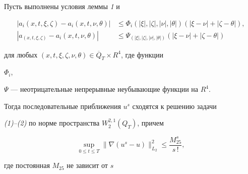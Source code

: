 \begin{thm}


Пусть выполнены условия леммы {\em 1} и


\begin{equation}


\begin{split}


|a_i(x,t,\xi,\zeta)-a_i(x,t,\nu,\theta)|&\le


\Phi_i(|\xi|,|\zeta|,|\nu|,|\theta|)(|\xi-\nu|+|\zeta-\theta|),\\


|a_(x,t,\xi,\zeta)-a_i(x,t,\nu,\theta)|&\le


\Psi_(|\xi|,|\zeta|,|\nu|,|\theta|)(|\xi-\nu|+|\zeta-\theta|)


\end{split}


\end{equation}


для любых $(x,t,\xi,\zeta,\nu,\theta)\in\overline Q_T\times R^4$, где функции


$\Phi_i$,


$\Psi$ --- неотрицательные непрерывные неубывающие функции на $R^4$.





Тогда последовательные приближения $u^s$ сходятся к решению задачи


{\em (1)--(2)} по норме пространства $W^{2,1}_2(Q_T)$, причем


\begin{equation}


\sup_{0\le t\le T}\|\nabla(u^s-u)\|^2_{L_2}\le


\frac{M^s_{25}}{s\,!},


\end{equation}


где постоянная $M_{25}$ не зависит от $s$


\end{thm}





